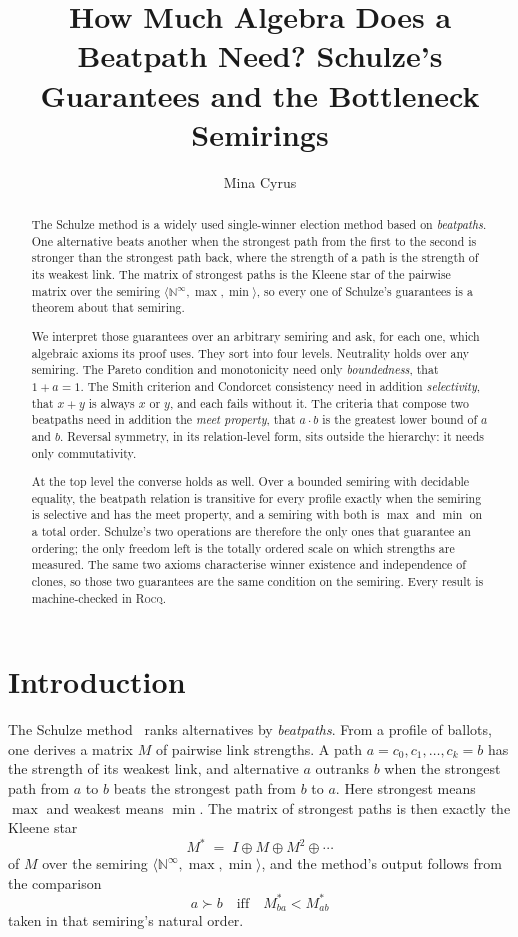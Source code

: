 \documentclass[a4paper,UKenglish,cleveref,autoref,thm-restate,anonymous]{lipics-v2021}
\title{How Much Algebra Does a Beatpath Need? Schulze's Guarantees and the Bottleneck Semirings}
\author{Mina Cyrus}{Department of Computer Science, Swansea University,
  Swansea, UK}{m.a.cyrus@swansea.ac.uk}{}{}
\newcommand{\Mstar}{M^{\ast}}
\newcommand{\rocq}{\textsc{Rocq}}
\begin{document}
\maketitle

\begin{abstract}
The Schulze method is a widely used single-winner election method based on
\emph{beatpaths}. One alternative beats another when the strongest path
from the first to the second is stronger than the strongest path back,
where the strength of a path is the strength of its weakest link. The
matrix of strongest paths is the Kleene star of the pairwise matrix over
the semiring $\langle \mathbb{N}^{\infty}, \max, \min\rangle$, so every
one of Schulze's guarantees is a theorem about that semiring.

We interpret those guarantees over an arbitrary semiring and ask, for each
one, which algebraic axioms its proof uses. They sort into four levels.
Neutrality holds over any semiring. The Pareto condition and monotonicity
need only \emph{boundedness}, that $1 + a = 1$. The Smith criterion and
Condorcet consistency need in addition \emph{selectivity}, that $x + y$ is
always $x$ or $y$, and each fails without it. The criteria that compose two
beatpaths need in addition the \emph{meet property}, that $a \cdot b$ is
the greatest lower bound of $a$ and $b$. Reversal symmetry, in its
relation-level form, sits outside the hierarchy: it needs only
commutativity.

At the top level the converse holds as well. Over a bounded semiring with
decidable equality, the beatpath relation is transitive for every profile
exactly when the semiring is selective and has the meet property, and a
semiring with both is $\max$ and $\min$ on a total order. Schulze's two
operations are therefore the only ones that guarantee an ordering; the only
freedom left is the totally ordered scale on which strengths are measured.
The same two axioms characterise winner existence and independence of
clones, so those two guarantees are the same condition on the semiring.
Every result is machine-checked in \rocq{}.
\end{abstract}

\section{Introduction}\label{sec:intro}
The Schulze method~\cite{schulze2011new} ranks alternatives by
\emph{beatpaths}. From a profile of ballots, one derives a matrix $M$ of
pairwise link strengths. A path $a = c_0, c_1, \dots, c_k = b$ has the
strength of its weakest link, and alternative $a$ outranks $b$ when the
strongest path from $a$ to $b$ beats the strongest path from $b$ to $a$.
Here strongest means $\max$ and weakest means $\min$. The matrix of
strongest paths is then exactly the Kleene star
\[
  \Mstar \;=\; I \oplus M \oplus M^{2} \oplus \cdots
\]
of $M$ over the semiring $\langle \mathbb{N}^{\infty}, \max, \min\rangle$,
and the method's output follows from the comparison
\[
  a \succ b \quad\text{iff}\quad \Mstar_{ba} < \Mstar_{ab}
\]
taken in that semiring's natural order.
\end{document}
